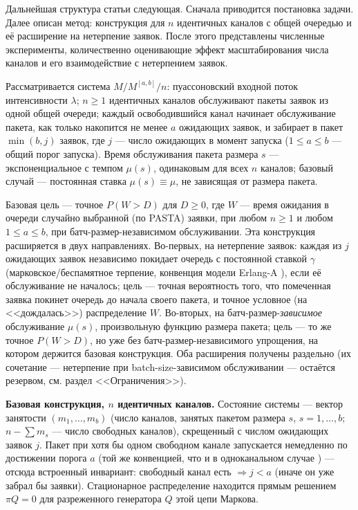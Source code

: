 \documentclass[12pt,a4paper]{article}
\newcommand{\articlesection}[1]{\par\vspace{14pt}{\bfseries #1}\par\vspace{6pt}\nopagebreak}
\begin{document}
Дальнейшая структура статьи следующая. Сначала приводится постановка задачи. Далее описан метод: конструкция для $n$ идентичных каналов с общей очередью и её расширение на нетерпение заявок. После этого представлены численные эксперименты, количественно оценивающие эффект масштабирования числа каналов и его взаимодействие с нетерпением заявок.

\articlesection{Постановка задачи}

Рассматривается система $M/M^{[a,b]}/n$: пуассоновский входной поток интенсивности $\lambda$; $n\ge1$ идентичных каналов обслуживают пакеты заявок из одной общей очереди; каждый освободившийся канал начинает обслуживание пакета, как только накопится не менее $a$ ожидающих заявок, и забирает в пакет $\min(b,j)$ заявок, где $j$ --- число ожидающих в момент запуска ($1\le a\le b$ --- общий порог запуска). Время обслуживания пакета размера $s$ --- экспоненциальное с темпом $\mu(s)$, одинаковым для всех $n$ каналов; базовый случай --- постоянная ставка $\mu(s)\equiv\mu$, не зависящая от размера пакета.

Базовая цель --- точное $P(W>D)$ для $D\ge0$, где $W$ --- время ожидания в очереди случайно выбранной (по PASTA) заявки, при любом $n\ge1$ и любом $1\le a\le b$, при батч-размер-независимом обслуживании. Эта конструкция расширяется в двух направлениях. Во-первых, на нетерпение заявок: каждая из $j$ ожидающих заявок независимо покидает очередь с постоянной ставкой $\gamma$ (марковское/беспамятное терпение, конвенция модели Erlang-A \cite{garnett2002}), если её обслуживание не началось; цель --- точная вероятность того, что помеченная заявка покинет очередь до начала своего пакета, и точное условное (на <<дождалась>>) распределение $W$. Во-вторых, на батч-размер-\textit{зависимое} обслуживание $\mu(s)$, произвольную функцию размера пакета; цель --- то же точное $P(W>D)$, но уже без батч-размер-независимого упрощения, на котором держится базовая конструкция. Оба расширения получены раздельно (их сочетание --- нетерпение при batch-size-зависимом обслуживании --- остаётся резервом, см. раздел <<Ограничения>>).

\articlesection{Метод}

\noindent\textbf{Базовая конструкция, $n$ идентичных каналов.} Состояние системы --- вектор занятости $(m_1,\dots,m_b)$ (число каналов, занятых пакетом размера $s$, $s=1,\dots,b$; $n-\sum m_s$ --- число свободных каналов), скрещенный с числом ожидающих заявок $j$. Пакет при хотя бы одном свободном канале запускается немедленно по достижении порога $a$ (той же конвенцией, что и в одноканальном случае \cite{khabarovsingle2026}) --- отсюда встроенный инвариант: свободный канал есть $\Rightarrow j<a$ (иначе он уже забрал бы заявки). Стационарное распределение находится прямым решением $\pi Q=0$ для разреженного генератора $Q$ этой цепи Маркова.
\end{document}
